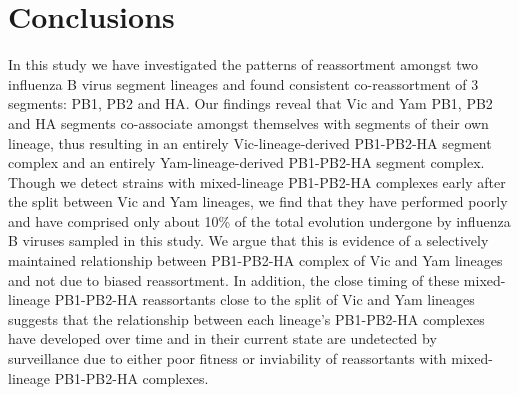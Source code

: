 \documentclass[11pt,oneside,letterpaper]{article}
\begin{document}
\section*{Conclusions}
In this study we have investigated the patterns of reassortment amongst two influenza B virus segment lineages and found consistent co-reassortment of 3 segments: PB1, PB2 and HA.
Our findings reveal that Vic and Yam PB1, PB2 and HA segments co-associate amongst themselves with segments of their own lineage, thus resulting in an entirely Vic-lineage-derived PB1-PB2-HA segment complex and an entirely Yam-lineage-derived PB1-PB2-HA segment complex.
Though we detect strains with mixed-lineage PB1-PB2-HA complexes early after the split between Vic and Yam lineages, we find that they have performed poorly and have comprised only about 10\% of the total evolution undergone by influenza B viruses sampled in this study.
We argue that this is evidence of a selectively maintained relationship between PB1-PB2-HA complex of Vic and Yam lineages and not due to biased reassortment.
In addition, the close timing of these mixed-lineage PB1-PB2-HA reassortants close to the split of Vic and Yam lineages suggests that the relationship between each lineage's PB1-PB2-HA complexes have developed over time and in their current state are undetected by surveillance due to either poor fitness or inviability of reassortants with mixed-lineage PB1-PB2-HA complexes.







\end{document}
